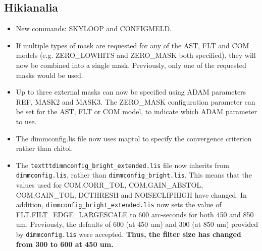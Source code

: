 \documentclass[oneside,11pt]{starlink}
\begin{document}
\subsection{Hikianalia}
\begin{itemize}
\item New commands: SKYLOOP and CONFIGMELD.
\item If multiple types of mask are requested for any of the AST, FLT
and COM models (e.g. ZERO\_LOWHITS and ZERO\_MASK both specified),
they will now be combined into a single mask. Previously, only one
of the requested masks would be used.
\item Up to three external masks can now be specified using ADAM parameters
REF, MASK2 and MASK3. The ZERO\_MASK configuration parameter can be set
for the AST, FLT or COM model, to indicate which ADAM parameter to use.
\item The dimmconfig.lis file now uses maptol to specify the convergence
criterion rather than chitol.
\item The \texttt{textttdimmconfig\_bright\_extended.lis} file now inherits from
\texttt{dimmconfig.lis}, rather than \texttt{dimmconfig\_bright.lis}. This means
that the values used for COM.CORR\_TOL, COM.GAIN\_ABSTOL, COM.GAIN\_TOL, DCTHRESH and
NOISECLIPHIGH have changed. In addition, \texttt{dimmconfig\_bright\_extended.lis}
now sets the value of FLT.FILT\_EDGE\_LARGESCALE to 600 arc-seconds for
both 450 and 850 um. Previously, the defaults of 600 (at 450 um) and 300
(at 850 um) provided by \texttt{dimmconfig.lis} were accepted. {\bf Thus, the filter
size has changed from 300 to 600 at 450 um.}
\end{itemize}
\end{document}
